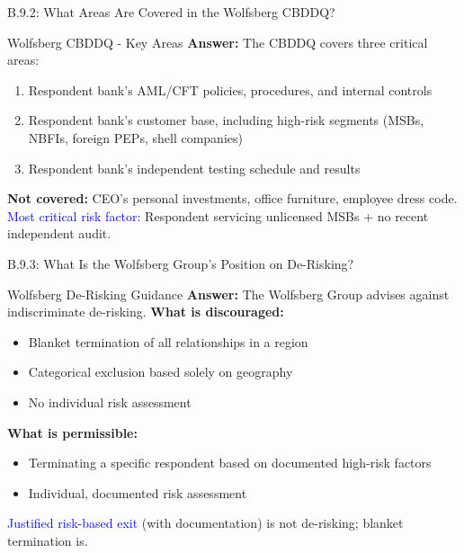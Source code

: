 \documentclass{beamer}
\begin{document}
	\begin{frame}{B.9.2: What Areas Are Covered in the Wolfsberg CBDDQ?}
		\begin{block}{Wolfsberg CBDDQ - Key Areas}
			\textbf{Answer:} The CBDDQ covers three critical areas:
			\vspace{0.2cm}
			\begin{enumerate}
				\item Respondent bank's AML/CFT policies, procedures, and internal controls
				\item Respondent bank's customer base, including high-risk segments (MSBs, NBFIs, foreign PEPs, shell companies)
				\item Respondent bank's independent testing schedule and results
			\end{enumerate}
			\textbf{Not covered:} CEO's personal investments, office furniture, employee dress code.
			\textcolor{blue}{Most critical risk factor:} Respondent servicing unlicensed MSBs + no recent independent audit.
		\end{block}
	\end{frame}
	
	\begin{frame}{B.9.3: What Is the Wolfsberg Group's Position on De-Risking?}
		\begin{block}{Wolfsberg De-Risking Guidance}
			\textbf{Answer:} The Wolfsberg Group advises against indiscriminate de-risking.
			\vspace{0.2cm}
			\textbf{What is discouraged:}
			\begin{itemize}
				\item Blanket termination of all relationships in a region
				\item Categorical exclusion based solely on geography
				\item No individual risk assessment
			\end{itemize}
			\textbf{What is permissible:}
			\begin{itemize}
				\item Terminating a specific respondent based on documented high-risk factors
				\item Individual, documented risk assessment
			\end{itemize}
			\textcolor{blue}{Justified risk-based exit} (with documentation) is not de-risking; blanket termination is.
		\end{block}
	\end{frame}
	
	
\end{document}
